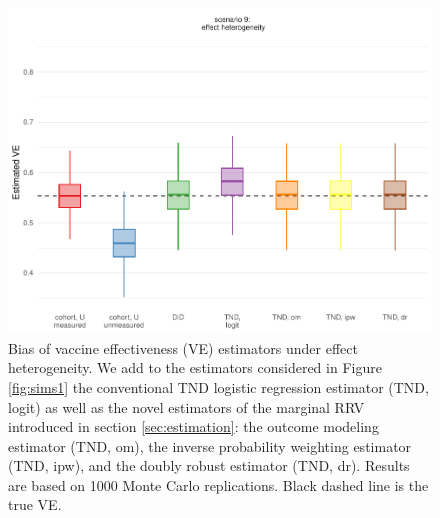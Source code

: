 \documentclass[11pt]{article}
\begin{document}
\begin{figure}
    \centering
    \includegraphics{../results/sims2.pdf}
    \caption{Bias of vaccine effectiveness (VE) estimators under effect heterogeneity. We add to the estimators considered in Figure \ref{fig:sims1} the conventional TND logistic regression estimator (TND, logit) as well as the novel estimators of the marginal RRV introduced in section \ref{sec:estimation}: the outcome modeling estimator (TND, om), the inverse probability weighting estimator (TND, ipw), and the doubly robust estimator (TND, dr). Results are based on 1000 Monte Carlo replications. Black dashed line is the true VE.}
    \label{fig:sims2}
\end{figure}

\clearpage


\end{document}
